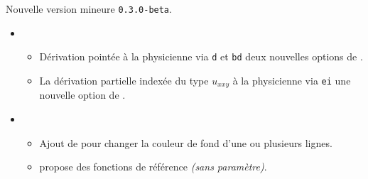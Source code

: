 Nouvelle version mineure \verb+0.3.0-beta+.

\begin{itemize}[itemsep=.5em]
    \item {}
    \begin{itemize}[itemsep=.5em]
        \item Dérivation pointée à la physicienne via \verb+d+ et \verb+bd+ deux nouvelles options de .

        \item La dérivation partielle indexée du type $u_{xxy}$ à la physicienne via \verb+ei+ une nouvelle option de .
    \end{itemize}


    \item {}
    \begin{itemize}[itemsep=.5em]
        \item Ajout de  pour changer la couleur de fond d'une ou plusieurs lignes.


        \item {} propose des fonctions de référence \emph{(sans paramètre)}.
    \end{itemize}
\end{itemize}

\separation
